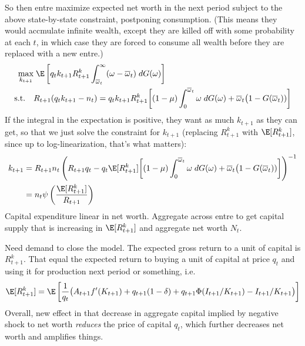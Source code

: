 \documentclass[12pt]{article}
\theoremstyle{plain}
\theoremstyle{definition}
\theoremstyle{remark}
\begin{document}
So then entre maximize expected net worth in the next period subject to
the above state-by-state constraint, postponing consumption. (This means
they would accmulate infinite wealth, except they are killed off with
some probability at each $t$, in which case they are forced to consume
all wealth before they are replaced with a new entre.)
\begin{align*}
  \max_{k_{t+1}}
  &\;
  \E\left[
  q_tk_{t+1}R_{t+1}^k
  \int_{\overline{\omega}_t}^\infty
  (\omega-\overline{\omega}_t)\;dG(\omega)
  \right]
  \\
  \text{s.t.}\quad
  &
  R_{t+1}(q_tk_{t+1}-n_t)
  =
  q_tk_{t+1}
  R_{t+1}^k
  \bigg[
  (1-\mu)\int_0^{\overline{\omega}_t}
  \omega\;dG(\omega)
  +
  \overline{\omega}_t\big(1-G(\overline{\omega}_t))
  \bigg]
\end{align*}
If the integral in the expectation is positive, they want as much
$k_{t+1}$ as they can get, so that we just solve the constraint for
$k_{t+1}$ (replacing $R_{t+1}^k$ with $\E[R_{t+1}^k]$, since up to
log-linearization, that's what matters):
\begin{align*}
  k_{t+1}
  &=
  R_{t+1}n_t
  \left(
  R_{t+1}q_t
  -
  q_t
  \E[
  R_{t+1}^k
  ]
  \bigg[
  (1-\mu)\int_0^{\overline{\omega}_t}
  \omega\;dG(\omega)
  +
  \overline{\omega}_t\big(1-G(\overline{\omega}_t))
  \bigg]
  \right)^{-1}
  \\
  &=
  n_t
  \psi\left(
  \frac{\E[R_{t+1}^k]}{R_{t+1}}
  \right)
\end{align*}
Capital expenditure linear in net worth.
Aggregate across entre to get capital supply that is increasing in
$\E[R_{t+1}^k]$ and aggregate net worth $N_t$.

Need demand to close the model.
The expected gross return to a unit of capital is $R_{t+1}^k$.
That equal the expected return to buying a unit of capital at price
$q_t$ and using it for production next period or something, i.e.
\begin{align*}
  \E[R_{t+1}^k]
  =
  \E\left[
  \frac{1}{q_t}
  \big(
  A_{t+1}f'(K_{t+1})
  + q_{t+1}(1-\delta)
  + q_{t+1}\Phi(I_{t+1}/K_{t+1})
  - I_{t+1}/K_{t+1}
  \big)
  \right]
\end{align*}
Overall, new effect in that decrease in aggregate capital implied by
negative shock to net worth \emph{reduces} the price of capital $q_t$,
which further decreases net worth and amplifies things.
\end{document}
